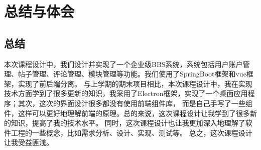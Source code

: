 \documentclass[UTF8]{ctexart}
\begin{document}
\newpage
\section{总结与体会}

\subsection{总结}

本次课程设计中，我们设计并实现了一个企业级BBS系统，系统包括用户账户管理、帖子管理、评论管理、模块管理等功能。我们使用了SpringBoot框架和vue框架，实现了前后端分离。
与上学期的期末项目相比，本次课程设计中，我在实现技术方面学到了很多更新的知识，我采用了Electron框架，实现了一个桌面应用程序；其次，这次的界面设计很多都没有使用前端组件库，
而是自己手写了一些组件，这样可以更好地理解前端的原理。总的来说，这次课程设计让我学到了很多新的知识，提高了我的技术水平。
同时，这次课程设计也让我更加深入地理解了软件工程的一些概念，比如需求分析、设计、实现、测试等。
总之，这次课程设计让我受益匪浅。
\end{document}

